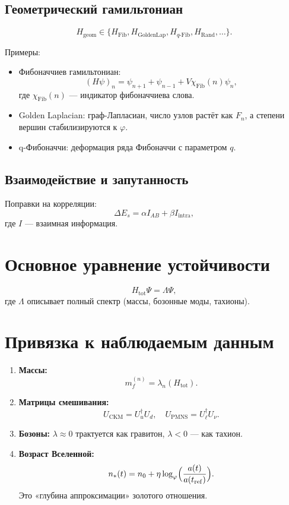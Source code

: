\documentclass[12pt,a4paper]{article}
\begin{document}
\subsection{Геометрический гамильтониан}
\[
H_{\mathrm{geom}} \in \{ H_{\mathrm{Fib}}, H_{\mathrm{GoldenLap}}, H_{q\text{-Fib}}, H_{\mathrm{Rand}}, \dots \}.
\]

Примеры:
\begin{itemize}
    \item Фибоначчиев гамильтониан:
    \[
    (H\psi)_n = \psi_{n+1} + \psi_{n-1} + V\chi_{\text{Fib}}(n)\psi_n,
    \]
    где $\chi_{\text{Fib}}(n)$ — индикатор фибоначчиева слова.
    \item Golden Laplacian: граф-Лапласиан, число узлов растёт как $F_n$, а степени вершин стабилизируются к $\varphi$.
    \item q-Фибоначчи: деформация ряда Фибоначчи с параметром $q$.
\end{itemize}

\subsection{Взаимодействие и запутанность}
Поправки на корреляции:
\[
\Delta E_s = \alpha I_{AB} + \beta I_{\mathrm{intra}},
\]
где $I$ — взаимная информация.

\section{Основное уравнение устойчивости}
\[
H_{\mathrm{tot}} \Psi = \Lambda \Psi ,
\]
где $\Lambda$ описывает полный спектр (массы, бозонные моды, тахионы).

\section{Привязка к наблюдаемым данным}
\begin{enumerate}
    \item \textbf{Массы:}
    \[
    m_f^{(n)} = \lambda_n(H_{\mathrm{tot}}).
    \]
    \item \textbf{Матрицы смешивания:}
    \[
    U_{\mathrm{CKM}} = U_u^\dagger U_d, \quad U_{\mathrm{PMNS}} = U_\ell^\dagger U_\nu.
    \]
    \item \textbf{Бозоны:}  
    $\lambda \approx 0$ трактуется как гравитон, $\lambda < 0$ — как тахион.
    \item \textbf{Возраст Вселенной:}
    \[
    n_*(t) = n_0 + \eta \log_{\varphi}\!\Big(\frac{a(t)}{a(t_{\rm ref})}\Big).
    \]
    Это «глубина аппроксимации» золотого отношения.
\end{enumerate}
\end{document}
